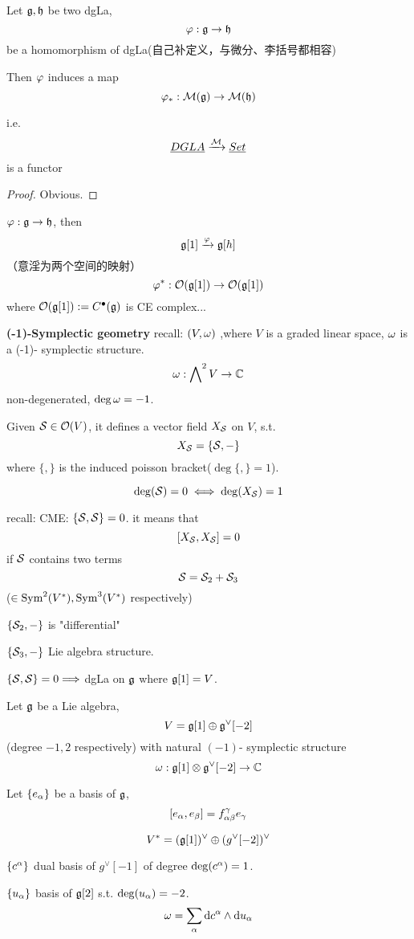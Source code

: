 \begin{prop}
Let $\mathfrak{g},\mathfrak{h}$ be two dgLa, 
$$\varphi:\mathfrak{g}\to\mathfrak{h}$$
be a homomorphism of dgLa(自己补定义，与微分、李括号都相容)

Then $\varphi$ induces a map 
$$\varphi_*: \mathcal{M}(\mathfrak{g})\to\mathcal{M}(\mathfrak{h})$$

i.e. 
$$\underline{DGLA}\xrightarrow{\mathcal{M}}\underline{Set}$$
is a functor
\end{prop}

\begin{proof}
Obvious.
\end{proof}

$\varphi:\mathfrak{g}\to\mathfrak{h}$, then 
$$\mathfrak{g}[1]\xrightarrow{\varphi}\mathfrak{g}[h]$$
（意淫为两个空间的映射）
$$\varphi^*:\mathcal{O}(\mathfrak{g}[1])\to\mathcal{O}(\mathfrak{g}[1])$$
where $\mathcal{O}(\mathfrak{g}[1]):=C^{\bullet}(\mathfrak{g})$ is CE complex...

\textbf{(-1)-Symplectic geometry}
recall: $(V,\omega)$ ,where $V$ is a graded linear space, $\omega$ is a (-1)- symplectic structure.
$$\omega:\bigwedge\nolimits^{2}V\to\mathbb{C}$$
non-degenerated, $\deg\omega=-1$.

Given $\mathcal{S}\in\mathcal{O}(V)$, it defines a vector field 
$X_{\mathcal{S}}$ on $V$, s.t. 
$$X_{\mathcal{S}}=\{\mathcal{S},-\}$$
where $\{,\}$ is the induced poisson bracket($\deg\{,\}=1$).

$$\deg(\mathcal{S})=0\iff\deg(X_{\mathcal{S}})=1$$

recall: CME: $\{\mathcal{S},\mathcal{S}\}=0$. it means that 
$$[X_{\mathcal{S}},X_{\mathcal{S}}]=0$$
if $\mathcal{S}$ contains two terms 
$$\mathcal{S}=\mathcal{S}_2+\mathcal{S}_3$$
($\in \operatorname{Sym}^2(V^*),\operatorname{Sym}^3(V^*)$ respectively)

$\{\mathcal{S}_2,-\}$ is "differential"

$\{\mathcal{S}_3,-\}$ Lie algebra structure.

$\{\mathcal{S},\mathcal{S}\}=0\Longrightarrow$ dgLa on $\mathfrak{g}$ where $\mathfrak{g}[1]=V$. 

\begin{example}
Let $\mathfrak{g}$ be a Lie algebra, 
$$V=\mathfrak{g}[1]\oplus\mathfrak{g}^\vee[-2]$$
(degree $-1,2$ respectively)
with natural $(-1)$- symplectic structure 
$$\omega:\mathfrak{g}[1]\otimes \mathfrak{g}^\vee[-2]\to\mathbb{C}$$


Let $\{e_\alpha\}$ be a basis of $\mathfrak{g}$,
$$[e_\alpha,e_\beta]=f^\gamma_{\alpha\beta}e_\gamma$$

$$V^*=(\mathfrak{g}[1])^\vee\oplus(g^\vee[-2])^\vee$$

$\{c^\alpha\}$ dual basis of $g^\vee[-1]$ of degree $\deg(c^\alpha)=1$.

$\{u_\alpha\}$ basis of $\mathfrak{g}[2]$ s.t. $\deg(u_\alpha)=-2$.
$$\omega=\sum_{\alpha}\mathrm{d} c^\alpha\wedge\mathrm{d} u_\alpha$$
\end{example}

